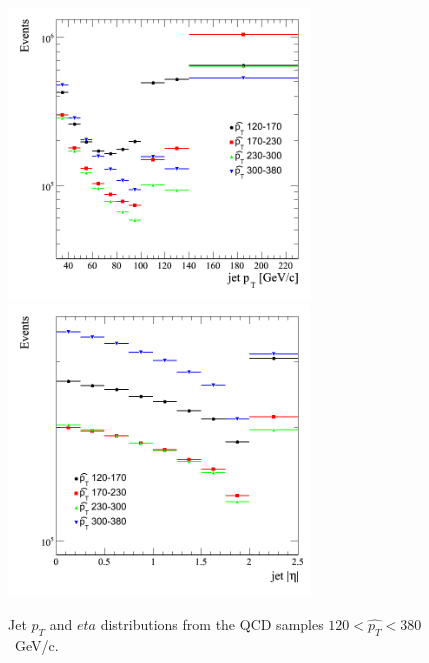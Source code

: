 \begin{figure}[htbp]
  \begin{center}
    \includegraphics[width=80mm]{Figures/jet_pt2qcdbinned.png}
    \includegraphics[width=80mm]{Figures/jet_eta_qcdbinned2.png}
  \end{center}
  \caption{Jet $p_T$ and $eta$ distributions from the QCD samples $120<\hat{p_T}<380$~GeV/c.}
  \label{fig:jet_pt_QCD2}
\end{figure}

